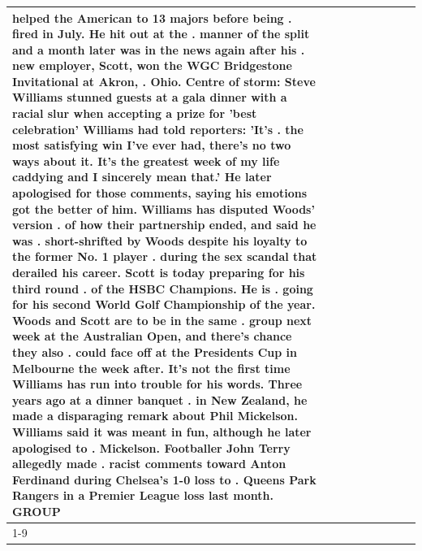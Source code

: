 \begin{table}[H]
\begin{tabular}{lllrlllll}
helped the American to 13 majors before being . fired in July. He hit out at the . manner of the split and a month later was in the news again after his . new employer, Scott, won the WGC Bridgestone Invitational at Akron, . Ohio. Centre of storm: Steve Williams stunned guests at a gala dinner with a racial slur when accepting a prize for 'best celebration' Williams had told reporters: 'It's . the most satisfying win I've ever had, there's no two ways about it. It's the greatest week of my life caddying and I sincerely mean that.' He later apologised for those comments, saying his emotions got the better of him. Williams has disputed Woods' version . of how their partnership ended, and said he was . short-shrifted by Woods despite his loyalty to the former No. 1 player . during the sex scandal that derailed his career. Scott is today preparing for his third round . of the HSBC Champions. He is . going for his second World Golf Championship of the year. Woods and Scott are to be in the same . group next week at the Australian Open, and there's chance they also . could face off at the Presidents Cup in Melbourne the week after. It's not the first time Williams has run into trouble for his words. Three years ago at a dinner banquet . in New Zealand, he made a disparaging remark about Phil Mickelson. Williams said it was meant in fun, although he later apologised to . Mickelson. Footballer John Terry allegedly made . racist comments toward Anton Ferdinand during Chelsea's 1-0 loss to . Queens Park Rangers in a Premier League loss last month. GROUP \\
\cline{1-9}

\end{tabular}
\end{table}
